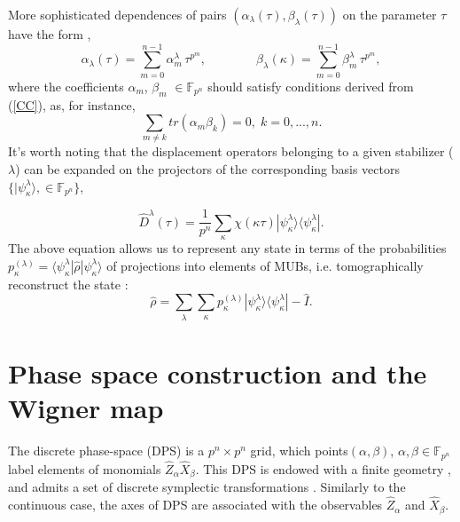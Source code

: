 \documentclass{article}
\begin{document}
More sophisticated dependences of pairs $\left( \alpha _{\lambda }(\tau
),\beta _{\lambda }(\tau )\right) $ on the parameter $\tau $ have the form 
\cite{GS2,JPA09}, 
\begin{equation}
\alpha _{\lambda }(\tau )=\sum_{m=0}^{n-1}\alpha _{m}^{\lambda }\,\tau
^{p^{m}},\qquad \qquad \beta _{\lambda }(\kappa )=\sum_{m=0}^{n-1}\beta
_{m}^{\lambda }\,\tau ^{p^{m}},  \label{curve1}
\end{equation}%
where the coefficients $\alpha _{m}$, $\beta _{m}$ $\in \mathbb{F}_{p^{n}}$
should satisfy conditions derived from (\ref{CC}), as, for instance, 
\begin{equation*}
\sum_{m\neq k}tr(\alpha _{m}\beta _{k})=0,\;k=0,...,n.
\end{equation*}%
It's worth noting that the displacement operators belonging to a given
stabilizer ($\lambda $) can be expanded on the projectors of the
corresponding basis vectors $\{|\psi _{\kappa }^{\lambda }\rangle ,\in 
\mathbb{F}_{p^{n}}\}$,

\begin{equation}
\hat{D}^{\lambda }(\tau )=\frac{1}{p^{n}}\sum_{\kappa }\chi (\kappa \tau
)|\psi _{\kappa }^{\lambda }\rangle \langle \psi _{\kappa }^{\lambda }|.
\label{Dexp}
\end{equation}%
The above equation allows us to represent any state in terms of the
probabilities $p_{\kappa }^{(\lambda )}=\langle \psi _{\kappa }^{\lambda }|%
\hat{\rho}|\psi _{\kappa }^{\lambda }\rangle $ of projections into elements
of MUBs, i.e. tomographically reconstruct the state \cite%
{gibbons,galvao,cormick,ivanovic,DFW11,DFW12,Durt2006}: 
\begin{equation}
\hat{\rho}=\sum_{\lambda }\sum_{\kappa }p_{\kappa }^{(\lambda )}|\psi
_{\kappa }^{\lambda }\rangle \langle \psi _{\kappa }^{\lambda }|-\hat{I}.
\label{tom r}
\end{equation}

\section{Phase space construction and the Wigner map}

The discrete phase-space (DPS) \cite{gibbons,galvao,cormick,DFW11,DFW12} is
a $p^{n}\times p^{n}$ grid, which points$(\alpha ,\beta )$, $\alpha ,\beta
\in \mathbb{F}_{p^{n}}$ label elements of monomials $\hat{Z}_{\alpha }\hat{X}%
_{\beta }$. This DPS is endowed with a finite geometry \cite%
{gibbons,galvao,cormick,DFW11,DFW12,FF}, and admits a set of discrete
symplectic transformations \cite{DFW2-1,DFW2-2,DFW2-3,DFW2-4,klimov06}.
Similarly to the continuous case, the axes of DPS are associated with the
observables $\hat{Z}_{\alpha }$ and $\hat{X}_{\beta }$.
\end{document}
